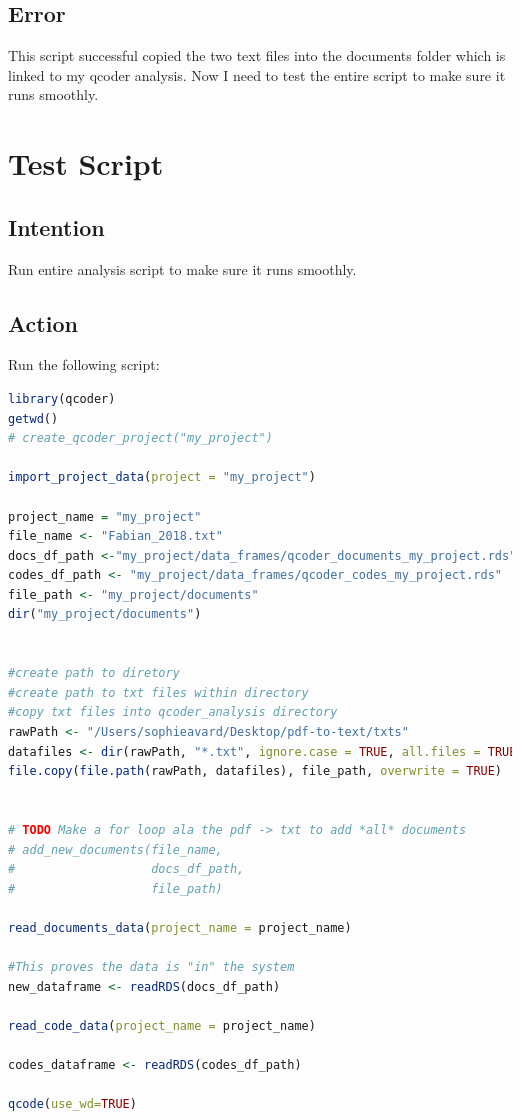 \documentclass{article}
\begin{document}
\subsection{Error}
This script successful copied the two text files into the documents folder which is linked to my qcoder analysis. Now I need to test the entire script to make sure it runs smoothly. 

\section{Test Script}
\subsection{Intention}
Run entire analysis script to make sure it runs smoothly.

\subsection{Action}
Run the following script:
\begin{lstlisting}[language=R]
library(qcoder)
getwd()
# create_qcoder_project("my_project")

import_project_data(project = "my_project")

project_name = "my_project"
file_name <- "Fabian_2018.txt"
docs_df_path <-"my_project/data_frames/qcoder_documents_my_project.rds"
codes_df_path <- "my_project/data_frames/qcoder_codes_my_project.rds"
file_path <- "my_project/documents"
dir("my_project/documents")


#create path to diretory
#create path to txt files within directory
#copy txt files into qcoder_analysis directory
rawPath <- "/Users/sophieavard/Desktop/pdf-to-text/txts"
datafiles <- dir(rawPath, "*.txt", ignore.case = TRUE, all.files = TRUE)
file.copy(file.path(rawPath, datafiles), file_path, overwrite = TRUE)


# TODO Make a for loop ala the pdf -> txt to add *all* documents
# add_new_documents(file_name,
#                   docs_df_path,
#                   file_path)

read_documents_data(project_name = project_name)

#This proves the data is "in" the system
new_dataframe <- readRDS(docs_df_path)

read_code_data(project_name = project_name)

codes_dataframe <- readRDS(codes_df_path)

qcode(use_wd=TRUE)
\end{lstlisting}
\end{document}
